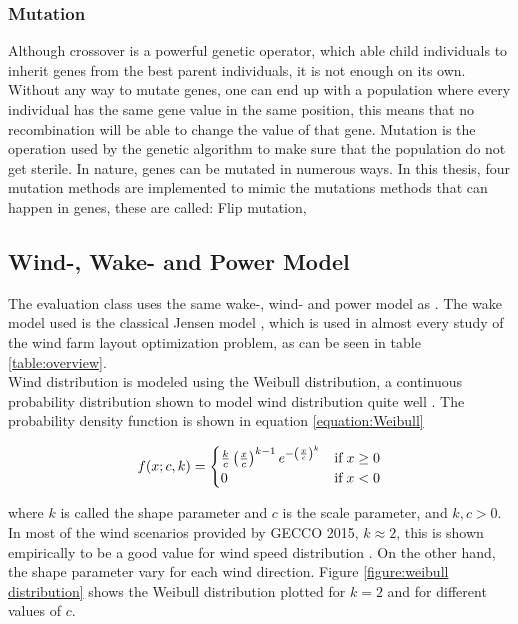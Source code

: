 \subsubsection{Mutation}
Although crossover is a powerful genetic operator, which able child individuals to inherit genes from the best parent individuals, it is not enough on its own. Without any way to mutate genes, one can end up with a population where every individual has the same gene value in the same position, this means that no recombination will be able to change the value of that gene. Mutation is the operation used by the genetic algorithm to make sure that the population do not get sterile. In nature, genes can be mutated in numerous ways. In this thesis, four mutation methods are implemented to mimic the mutations methods that can happen in genes, these are called: Flip mutation, 


\subsection{Wind-, Wake- and Power Model}\label{subsection:wind-, wake- and power model}
The evaluation class uses the same wake-, wind- and power model as \cite{Kusiak}. The wake model used is the classical Jensen model \citep{Jensen}, which is used in almost every study of the wind farm layout optimization problem, as can be seen in table \ref{table:overview}. \\

\noindent Wind distribution is modeled using the Weibull distribution, a continuous probability distribution shown to model wind distribution quite well \citep{Justus}. The probability density function is shown in equation \ref{equation:Weibull}


\begin{equation}
f(x; c, k)  = 
\begin{cases}
\frac{k}{c} \left( \frac{x}{c} \right)^{k-1} e^{- \left( \frac{x}{c} \right)^k } & \text{if} \hspace{1mm} x \geq 0 \\
0                                                                                                                      & \text{if} \hspace{1mm}     x < 0
\end{cases}
\label{equation:Weibull}
\end{equation}


\noindent where $k$ is called the shape parameter and $c$ is the scale parameter, and $k, c > 0$. In most of the wind scenarios provided by GECCO 2015, $k \approx 2$, this is shown empirically to be a good value for wind speed distribution \citep{Justus}. On the other hand, the shape parameter vary for each wind direction. Figure \ref{figure:weibull distribution} shows the Weibull distribution plotted for $k = 2$ and for different values of $c$. \\


